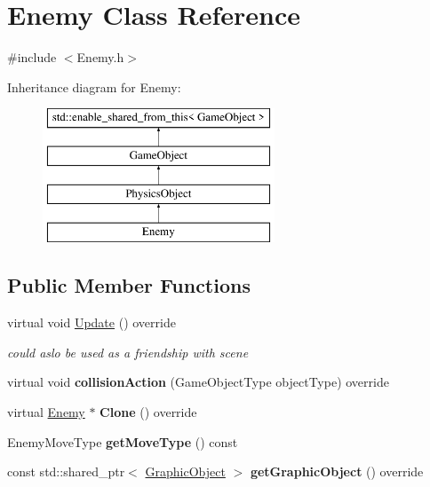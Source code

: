 \hypertarget{class_enemy}{}\section{Enemy Class Reference}
\label{class_enemy}


{\ttfamily \#include $<$Enemy.\+h$>$}

Inheritance diagram for Enemy\+:\begin{figure}[H]
\begin{center}
\leavevmode
\includegraphics[height=4.000000cm]{dd/d7a/class_enemy}
\end{center}
\end{figure}
\subsection*{Public Member Functions}
\begin{DoxyCompactItemize}
\item 
\mbox{\label{class_enemy_a614ad271f07ecf63cb3e665155b7e258}} 
virtual void \hyperlink{class_enemy_a614ad271f07ecf63cb3e665155b7e258}{Update} () override
\begin{DoxyCompactList}\small\item\em could aslo be used as a friendship with scene \end{DoxyCompactList}\item 
\mbox{\label{class_enemy_a6f2767af40b2147d2bf6ca34e36f8695}} 
virtual void {\bfseries collision\+Action} (Game\+Object\+Type object\+Type) override
\item 
\mbox{\label{class_enemy_afedc284c03f56afdf6ce2ce13921d408}} 
virtual \hyperlink{class_enemy}{Enemy} $\ast$ {\bfseries Clone} () override
\item 
\mbox{\label{class_enemy_a75603c5c5043105a25de1084868690a2}} 
Enemy\+Move\+Type {\bfseries get\+Move\+Type} () const
\item 
\mbox{\label{class_enemy_ad0c2cbb001f0a3335f2ce06939e1d7ed}} 
const std\+::shared\+\_\+ptr$<$ \hyperlink{class_graphic_object}{Graphic\+Object} $>$ {\bfseries get\+Graphic\+Object} () override
\end{DoxyCompactItemize}
